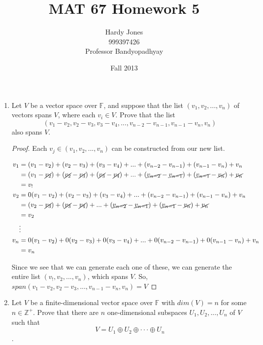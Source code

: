 \documentclass[12pt,letterpaper]{article}
\title{MAT 67 Homework 5\vspace{-2ex}}
\author{Hardy Jones\\
        999397426\\
        Professor Bandyopadhyay\vspace{-2ex}}
\date{Fall 2013}
\begin{document}
  \maketitle

  \begin{enumerate}
    \item
      Let $V$ be a vector space over $\mathbb{F}$,
      and suppose that the list $(v_1, v_2, ..., v_n)$ of vectors spans $V$,
      where each $v_i \in V$.
      Prove that the list 
      \[(v_1 - v_2, v_2 - v_3, v_3 - v_4, ..., v_{n-2} - v_{n-1}, v_{n-1} - v_n, v_n)\]
      also spans $V$.

      \begin{proof}
        Each $v_j \in (v_1, v_2, ..., v_n)$ can be constructed from our new list.

        \begin{align*}
          v_1 &= (v_1 - v_2) + (v_2 - v_3) + (v_3 - v_4) + ... + (v_{n-2} - v_{n-1}) + (v_{n-1} - v_n) + v_n \\
          &= (v_1 - \cancel{v_2}) + (\cancel{v_2} - \cancel{v_3}) + (\cancel{v_3} - \cancel{v_4}) + ... + (\cancel{v_{n-2}} - \cancel{v_{n-1}}) + (\cancel{v_{n-1}} - \cancel{v_n}) + \cancel{v_n} \\
          &= v_! \\
          v_2 &= 0(v_1 - v_2) + (v_2 - v_3) + (v_3 - v_4) + ... + (v_{n-2} - v_{n-1}) + (v_{n-1} - v_n) + v_n \\
          &= (v_2 - \cancel{v_3}) + (\cancel{v_3} - \cancel{v_4}) + ... + (\cancel{v_{n-2}} - \cancel{v_{n-1}}) + (\cancel{v_{n-1}} - \cancel{v_n}) + \cancel{v_n} \\
          &= v_2 \\
          &\vdots \\
          v_n &= 0(v_1 - v_2) + 0(v_2 - v_3) + 0(v_3 - v_4) + ... + 0(v_{n-2} - v_{n-1}) + 0(v_{n-1} - v_n) + v_n \\
          &= v_n
        \end{align*}

        Since we see that we can generate each one of these,
        we can generate the entire list $(v_!, v_2, ..., v_n)$, which spans $V$.
        So, $span(v_1 - v_2, v_2 - v_3, ..., v_{n-1}- v_n, v_n) = V$
      \end{proof}

    \item
      Let $V$ be a ﬁnite-dimensional vector space over $\mathbb{F}$
      with $dim(V) = n$ for some $n \in \mathbb{Z}^+$.
      Prove that there are $n$ one-dimensional subspaces $U_1, U_2, ..., U_n$ of $V$ such that
      \[V = U_1 \oplus U_2 \oplus · · · \oplus U_n\].

  \end{enumerate}
\end{document}
